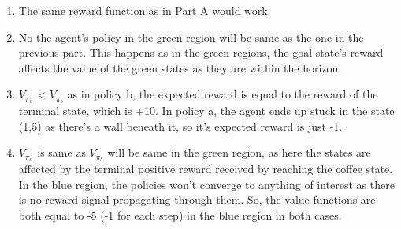 \documentclass{article}
\begin{document}
\begin{enumerate}[label=(\alph*)]
\item The same reward function as in Part A would work

\item No the agent's policy in the green region will be same as the one in the previous part. This happens as in the green regions, the goal state's reward affects the value of the green states as they are within the horizon. 
  
\item $V_{\pi_a}$ < $V_{\pi_b}$ as in policy b, the expected reward is equal to the reward of the terminal state, which is +10. In policy a, the agent ends up stuck in the state (1,5) as there's a wall beneath it, so it's expected reward is just -1.

\item $V_{\pi_a}$ is same as $V_{\pi_b}$ will be same in the green region, as here the states are affected by the terminal positive reward received by reaching the coffee state. In the blue region, the policies won't converge to anything of interest as there is no reward signal propagating through them. So, the value functions are both equal to -5 (-1 for each step) in the blue region in both cases.  

\end{enumerate}
\end{document}
